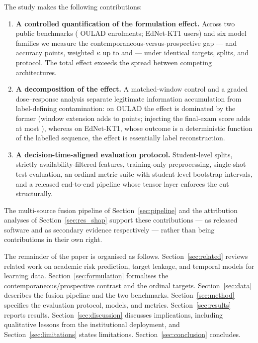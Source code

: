\documentclass[sn-mathphys,Numbered]{sn-jnl}
\begin{document}
The study makes the following contributions:
\begin{enumerate}
  \item \textbf{A controlled quantification of the formulation effect.} Across two public benchmarks (\nOULADenrol{} OULAD enrolments; \nEdNetusers{} EdNet-KT1 users) and six model families we measure the contemporaneous-versus-prospective gap --- \gapOULADaccRange{} and \gapEdNetaccRange{} accuracy points, weighted $\kappa$ up to \gapOULADqwkMax{} and \gapEdNetqwkMax{} --- under identical targets, splits, and protocol. The total effect exceeds the spread between competing architectures.
  \item \textbf{A decomposition of the effect.} A matched-window control and a graded dose--response analysis separate legitimate information accumulation from label-defining contamination: on OULAD the effect is dominated by the former (window extension adds \matchedExtAcc{} to \matchedExtAccBi{} points; injecting the final-exam score adds at most \matchedLeakLateMax{}), whereas on EdNet-KT1, whose outcome is a deterministic function of the labelled sequence, the effect is essentially label reconstruction.
  \item \textbf{A decision-time-aligned evaluation protocol.} Student-level splits, strictly availability-filtered features, training-only preprocessing, single-shot test evaluation, an ordinal metric suite with student-level bootstrap intervals, and a released end-to-end pipeline whose tensor layer enforces the cut structurally.
\end{enumerate}
The multi-source fusion pipeline of Section~\ref{sec:pipeline} and the attribution analyses of Section~\ref{sec:res_shap} support these contributions --- as released software and as secondary evidence respectively --- rather than being contributions in their own right.

\medskip
The remainder of the paper is organised as follows. Section~\ref{sec:related} reviews related work on academic risk prediction, target leakage, and temporal models for learning data. Section~\ref{sec:formulation} formalises the contemporaneous/prospective contrast and the ordinal targets. Section~\ref{sec:data} describes the fusion pipeline and the two benchmarks. Section~\ref{sec:method} specifies the evaluation protocol, models, and metrics. Section~\ref{sec:results} reports results. Section~\ref{sec:discussion} discusses implications, including qualitative lessons from the institutional deployment, and Section~\ref{sec:limitations} states limitations. Section~\ref{sec:conclusion} concludes.
\end{document}
